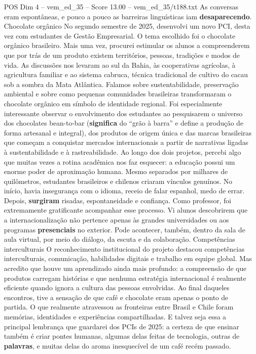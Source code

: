 \begin{textsample}{POS Dim 4 – vem\_ed\_35 – Score 13.00 – vem\_ed\_35/t188.txt}
As conversas eram espontâneas, e pouco a pouco as barreiras linguísticas iam \textbf{desaparecendo}.
Chocolate orgânico No segundo semestre de 2025, desenvolvi um novo PCI, desta vez com estudantes de Gestão Empresarial.
O tema escolhido foi o chocolate orgânico brasileiro.
Mais uma vez, procurei estimular os alunos a compreenderem que por trás de um produto existem territórios, pessoas, tradições e modos de vida.
As discussões nos levaram ao sul da Bahia, às cooperativas agrícolas, à agricultura familiar e ao sistema cabruca, técnica tradicional de cultivo do cacau sob a sombra da Mata Atlântica.
Falamos sobre sustentabilidade, preservação ambiental e sobre como pequenas comunidades brasileiras transformaram o chocolate orgânico em símbolo de identidade regional.
Foi especialmente interessante observar o envolvimento dos estudantes ao pesquisarem o universo dos chocolates bean-to-bar (\textbf{significa} do “grão à barra” e define a produção de forma artesanal e integral), dos produtos de origem única e das marcas brasileiras que começam a conquistar mercados internacionais a partir de narrativas ligadas à sustentabilidade e à rastreabilidade.
Ao longo dos dois projetos, percebi algo que muitas vezes a rotina acadêmica nos faz esquecer: a educação possui um enorme poder de aproximação humana.
Mesmo separados por milhares de quilômetros, estudantes brasileiros e chilenos criaram vínculos genuínos.
No início, havia insegurança com o idioma, receio de falar espanhol, medo de errar.
Depois, \textbf{surgiram} risadas, espontaneidade e confiança.
Como professor, foi extremamente gratificante acompanhar esse processo.
Vi alunos descobrirem que a internacionalização não pertence apenas às grandes universidades ou aos programas \textbf{presenciais} no exterior.
Pode acontecer, também, dentro da sala de aula virtual, por meio do diálogo, da escuta e da colaboração.
Competências interculturais O reconhecimento institucional do projeto destacou competências interculturais, comunicação, habilidades digitais e trabalho em equipe global.
Mas acredito que houve um aprendizado ainda mais profundo: a compreensão de que produtos carregam histórias e que nenhuma estratégia internacional é realmente eficiente quando ignora a cultura das pessoas envolvidas.
Ao final daqueles encontros, tive a sensação de que café e chocolate eram apenas o ponto de partida.
O que realmente atravessou as fronteiras entre Brasil e Chile foram memórias, identidades e experiências compartilhadas.
E talvez seja essa a principal lembrança que guardarei dos PCIs de 2025: a certeza de que ensinar também é criar pontes humanas, algumas delas feitas de tecnologia, outras de \textbf{palavras}, e muitas delas do aroma inesquecível de um café recém passado.

\end{textsample}
